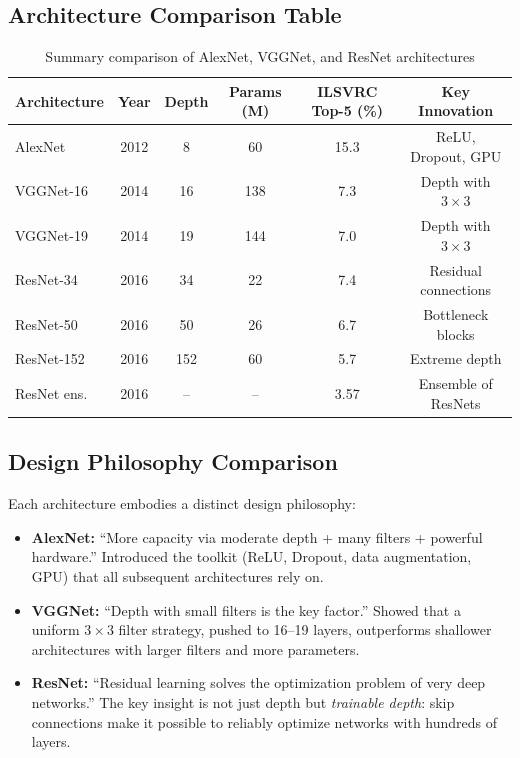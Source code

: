 \documentclass[12pt,a4paper]{article}
\begin{document}
\subsection{Architecture Comparison Table}

\begin{table}[ht]
\centering
\caption{Summary comparison of AlexNet, VGGNet, and ResNet architectures}
\label{tab:arch_summary}
\begin{tabular}{@{}lccccc@{}}
\toprule
Architecture & Year & Depth & Params (M) & ILSVRC Top-5 (\%) & Key Innovation \\
\midrule
AlexNet  & 2012 & 8   & 60  & 15.3 & ReLU, Dropout, GPU \\
VGGNet-16 & 2014 & 16  & 138 & 7.3  & Depth with $3\times3$ \\
VGGNet-19 & 2014 & 19  & 144 & 7.0  & Depth with $3\times3$ \\
ResNet-34  & 2016 & 34  & 22  & 7.4  & Residual connections \\
ResNet-50  & 2016 & 50  & 26  & 6.7  & Bottleneck blocks \\
ResNet-152 & 2016 & 152 & 60  & 5.7  & Extreme depth \\
ResNet ens. & 2016 & --  & --  & 3.57 & Ensemble of ResNets \\
\bottomrule
\end{tabular}
\end{table}

\subsection{Design Philosophy Comparison}

Each architecture embodies a distinct design philosophy:

\begin{itemize}[leftmargin=2em]
  \item \textbf{AlexNet:} ``More capacity via moderate depth + many filters + powerful hardware.'' Introduced the toolkit (ReLU, Dropout, data augmentation, GPU) that all subsequent architectures rely on.
  \item \textbf{VGGNet:} ``Depth with small filters is the key factor.'' Showed that a uniform $3\times3$ filter strategy, pushed to 16--19 layers, outperforms shallower architectures with larger filters and more parameters.
  \item \textbf{ResNet:} ``Residual learning solves the optimization problem of very deep networks.'' The key insight is not just depth but \emph{trainable depth}: skip connections make it possible to reliably optimize networks with hundreds of layers.
\end{itemize}
\end{document}
